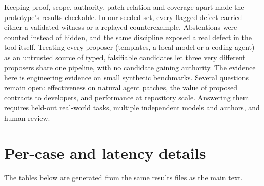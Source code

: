 \documentclass[10pt,twocolumn]{article}
\begin{document}
Keeping proof, scope, authority, patch relation and coverage apart made the prototype's results checkable. In our
seeded set, every flagged defect carried either a validated witness or a replayed counterexample. Abstentions were
counted instead of hidden, and the same discipline exposed a real defect in the tool itself. Treating every proposer
(templates, a local model or a coding agent) as an untrusted source of typed, falsifiable candidates let three very
different proposers share one pipeline, with no candidate gaining authority. The evidence here is engineering evidence
on small synthetic benchmarks. Several questions remain open: effectiveness on natural agent patches, the value of
proposed contracts to developers, and performance at repository scale. Answering them requires held-out real-world
tasks, multiple independent models and authors, and human review.

{\small


}

\onecolumn
\appendix
\section{Per-case and latency details}
The tables below are generated from the same results files as the main text.




\end{document}
